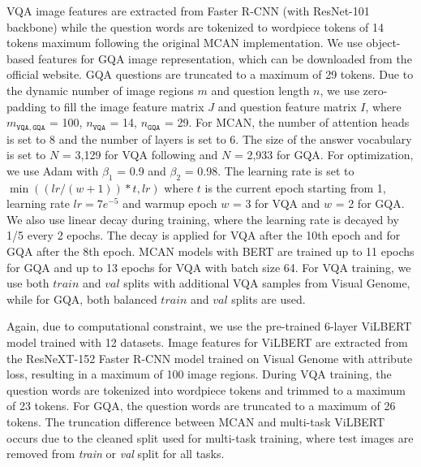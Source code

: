 \documentclass{article}
\begin{document}
VQA image features are extracted from Faster R-CNN (with ResNet-101 backbone) while the question words are tokenized to wordpiece tokens of 14 tokens maximum following the original MCAN implementation. We use object-based features for GQA image representation, which can be downloaded from the official website. GQA questions are truncated to a maximum of 29 tokens. Due to the dynamic number of image regions $m$ and question length $n$, we use zero-padding to fill the image feature matrix $J$ and question feature matrix $I$, where $m_{\mathtt{VQA},\mathtt{GQA}}$ = 100, $n_{\mathtt{VQA}}$ = 14, $n_{\mathtt{GQA}}$ = 29. For MCAN, the number of attention heads is set to 8 and the number of layers is set to 6. The size of the answer vocabulary is set to $N$ = 3,129 for VQA following \citet{yu2019mcan} and $N$ = 2,933 for GQA. For optimization, we use Adam \citep{kingma2014adam} with $\beta_{1}$ = 0.9 and $\beta_{2}$ = 0.98. The learning rate is set to $\min( (lr/(w+1)) * t, lr)$ where $t$ is the current epoch starting from 1, learning rate $lr = 7e^{-5}$ and warmup epoch $w$ = 3 for VQA and $w$ = 2 for GQA. We also use linear decay during training, where the learning rate is decayed by 1/5 every 2 epochs. The decay is applied for VQA after the 10th epoch and for GQA after the 8th epoch. MCAN models with BERT are trained up to 11 epochs for GQA and up to 13 epochs for VQA with batch size 64. For VQA training, we use both $train$ and $val$ splits with additional VQA samples from Visual Genome, while for GQA, both balanced $train$ and $val$ splits are used.

Again, due to computational constraint, we use the pre-trained 6-layer ViLBERT model trained with 12 datasets. Image features for ViLBERT are extracted from the ResNeXT-152 \citep{Xie2016} Faster R-CNN model trained on Visual Genome with attribute loss, resulting in a maximum of 100 image regions. During VQA training, the question words are tokenized into wordpiece tokens and trimmed to a maximum of 23 tokens. For GQA, the question words are truncated to a maximum of 26 tokens. The truncation difference between MCAN and multi-task ViLBERT occurs due to the cleaned split used for multi-task training, where test images are removed from \textit{train} or \textit{val} split for all tasks.

\end{document}
